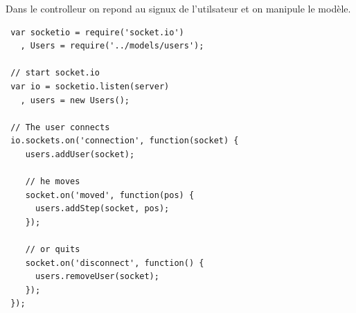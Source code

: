 \documentclass[a4paper]{article}
\begin{document}
Dans le controlleur on repond au signux de l'utilsateur et on manipule 
le modèle.

\begin{lstlisting}
 var socketio = require('socket.io')
   , Users = require('../models/users');

 // start socket.io
 var io = socketio.listen(server)
   , users = new Users();

 // The user connects
 io.sockets.on('connection', function(socket) {
    users.addUser(socket);
    
    // he moves
    socket.on('moved', function(pos) {
      users.addStep(socket, pos);
    });

    // or quits
    socket.on('disconnect', function() {
      users.removeUser(socket);
    });
 });
\end{lstlisting}
\end{document}
